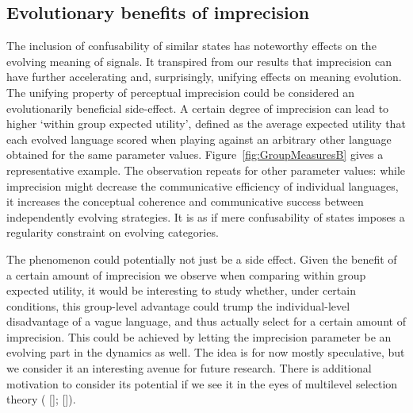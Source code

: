 \documentclass[12pt,english]{article}
\numberwithin{equation}{section}
\newcommand{\citealtbjps}[1]{\citeauthor{#1} [\citeyear{#1}]}
\begin{document}

\subsection{Evolutionary benefits of imprecision}
The inclusion of confusability of similar states has noteworthy effects on the evolving meaning
of signals.  It transpired from our results that imprecision can have further accelerating and,
surprisingly, unifying effects on meaning evolution.  The unifying property of perceptual
imprecision could be considered an evolutionarily beneficial side-effect. A certain degree of
imprecision can lead to higher `within group expected utility', defined as the average
expected utility that each evolved language scored when playing against an arbitrary other
language obtained for the same parameter values. Figure~\ref{fig:GroupMeasuresB} gives a
representative example. The observation repeats for other parameter values: while imprecision
might decrease the communicative efficiency of individual languages, it increases the
conceptual coherence and communicative success between independently evolving strategies. It is
as if mere confusability of states imposes a regularity constraint on evolving categories.

The phenomenon could potentially not just be a side effect.  Given the benefit of a certain
amount of imprecision we observe when comparing within group expected utility, it would be
interesting to study whether, under certain conditions, this group-level advantage could trump
the individual-level disadvantage of a vague language, and thus actually select for a certain
amount of imprecision.  This could be achieved by letting the imprecision parameter be an
evolving part in the dynamics as well. The idea is for now mostly speculative, but we consider
it an interesting avenue for future research.  There is additional motivation to consider its
potential if we see it in the eyes of multilevel selection theory
(\citealtbjps{Wilson1994}; \citealtbjps{OGorman2008}).
\end{document}
